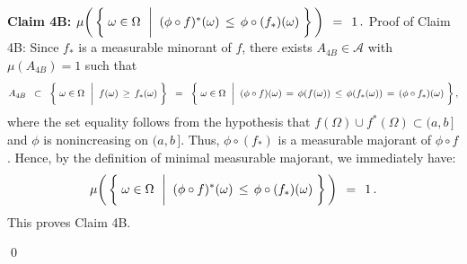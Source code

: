 \begin{enumerate}
	\vskip 0.5cm
	\noindent
	\textbf{Claim 4B:}\quad
	$\mu\!\left(\,\left\{\;
		\omega \in \Omega
		\,\;\left\vert\;\;
		(\phi \circ f)^{*}(\omega) \,\overset{{\color{white}\vert}}{\leq}\, \phi \circ (f_{*})(\omega)
		\right.
	\,\right\}\,\right)
	\,\;=\;\, 1\,.$
	\vskip 0.2cm
	\noindent
	Proof of Claim 4B:\;\;
	Since $f_{*}$ is a measurable minorant of $f$,
	there exists $A_{4B} \in \mathcal{A}$ with $\mu(A_{4B}) = 1$ such that
	\begin{equation*}
	A_{4B}
	\;\;\subset\;\;
		\left\{\;
			\omega \in \Omega
			\,\;\left\vert\;\;
			f(\omega) \,\overset{{\color{white}\vert}}{\geq}\, f_{*}(\omega)
		\right.
		\,\right\}
	\;\; = \;\;
		\left\{\;
			\omega \in \Omega
			\,\;\left\vert\;\;
			(\phi \circ f)(\omega) \,=\, \phi(f(\omega)) \,\overset{{\color{white}\vert}}{\leq}\, \phi(f_{*}(\omega)) \,=\, (\phi \circ f_{*})(\omega)
		\right.
		\,\right\},
	\end{equation*}
	where the set equality follows from the hypothesis that $f(\Omega) \cup f^{*}(\Omega) \subset (a,b\,]$
	and $\phi$ is nonincreasing on $(a,b\,]$.
	Thus, $\phi \circ (f_{*})$ is a measurable majorant of $\phi \circ f$.
	Hence, by the definition of minimal measurable majorant, we immediately have:
	\begin{equation*}
	\mu\!\left(\,\left\{\;
		\omega \in \Omega
		\,\;\left\vert\;\;
		(\phi \circ f)^{*}(\omega) \,\overset{{\color{white}\vert}}{\leq}\, \phi \circ (f_{*})(\omega)
		\right.
	\,\right\}\,\right)
	\,\;=\;\, 1\,.
	\end{equation*}
	This proves Claim 4B.
\end{enumerate}
\qed


\renewcommand{\theenumi}{\roman{enumi}}
\renewcommand{\labelenumi}{\textnormal{(\theenumi)}$\;\;$}

